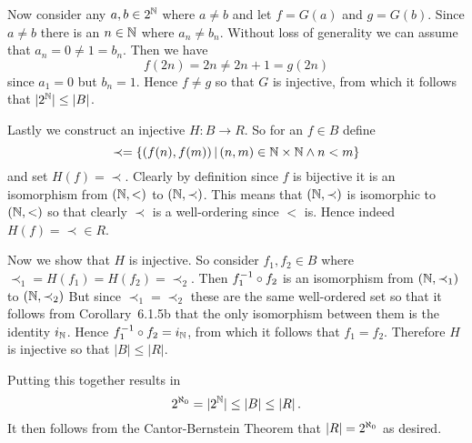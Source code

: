\begin{solution}
    Now consider any $a, b \in 2^{\mathbb{N}}$ where $a \neq b$ and let $f = G(a)$ and $g = G(b)$.
    Since $a \neq b $ there is an $n \in \mathbb{N}$ where $a_n \neq b_n$.
    Without loss of generality we can assume that $a_n = 0 \neq 1 = b_n$.
    Then we have
    $$
    f(2n) = 2n \neq 2n+1 = g(2n)
    $$
    since $a_1 = 0$ but $b_n = 1$.
    Hence $f \neq g$ so that $G$ is injective, from which it follows that $|2^{\mathbb{N}}| \leq |B|$.

    Lastly we construct an injective $H : B \to R$.
    So for an $f \in B$ define
    $$
    \prec = \left\{ (f(n), f(m)) \,|\, (n,m) \in \mathbb{N} \times \mathbb{N} \land n < m \right\}
    $$
    and set $H(f) = \prec$.
    Clearly by definition since $f$ is bijective it is an isomorphism from $(\mathbb{N}, <)$ to $(\mathbb{N}, \prec)$.
    This means that $(\mathbb{N}, \prec)$ is isomorphic to $(\mathbb{N}, <)$ so that clearly $\prec$ is a well-ordering since $<$ is.
    Hence indeed $H(f) = \prec \in R$.

    Now we show that $H$ is injective.
    So consider $f_1, f_2 \in B$ where $\prec_1 = H(f_1) = H(f_2) = \prec_2$.
    Then $f_1^{-1} \circ f_2$ is an isomorphism from $(\mathbb{N}, \prec_1)$ to $(\mathbb{N}, \prec_2)$
    But since $\prec_1 = \prec_2$ these are the same well-ordered set so that it follows from Corollary~6.1.5b that the only isomorphism between them is the identity $i_{\mathbb{N}}$.
    Hence $f_1^{-1} \circ f_2 = i_{\mathbb{N}}$, from which it follows that $f_1 = f_2$.
    Therefore $H$ is injective so that $|B| \leq |R|$.

    Putting this together results in
    $$
    {2^{\aleph_0}} = |2^{\mathbb{N}}| \leq |B| \leq |R| \,.
    $$
    It then follows from the Cantor-Bernstein Theorem that $|R| = {2^{\aleph_0}}$ as desired. \qedsymbol
    
\end{solution}


